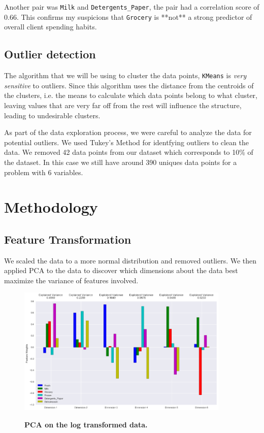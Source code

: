 \documentclass[twoside,openright,titlepage,numbers=noenddot,headinclude,%
               footinclude=true,cleardoublepage=empty,abstractoff,BCOR=5mm,%
               paper=a4,fontsize=11pt,ngerman,american]{scrreprt}
\numberwithin{theorem}{chapter}
\numberwithin{definition}{chapter}
\numberwithin{algorithm}{chapter}
\numberwithin{figure}{chapter}
\numberwithin{table}{chapter}
\numberwithin{equation}{chapter}
\begin{document}
Another pair was \texttt{Milk} and \texttt{Detergents\_Paper}, the pair had a correlation score of 0.66. This confirms my suspicions that \texttt{Grocery} is **not** a strong predictor of overall client spending habits.




\section*{Outlier detection}
The algorithm that we will be using to cluster the data points, \texttt{KMeans} is \emph{very sensitive} to outliers. Since this algorithm uses the distance from the centroids of the clusters, i.e. the means to calculate which data points belong to what cluster, leaving values that are very far off from the rest will influence the structure, leading to undesirable clusters.

As part of the data exploration process, we were careful to analyze the data for potential outliers. We used Tukey's Method for identfying outliers to clean the data. We removed 42 data points from our dataset which corresponds to 10\% of the dataset. In this case we still have around 390 uniques data points for a problem with 6 variables. 


\chapter*{Methodology}

\section*{Feature Transformation}
We scaled the data to a more normal distribution and  removed outliers. We then applied PCA to the data to discover which dimensions about the data best maximize the variance of features involved. 

\begin{figure}[!hbtp]
\centering
    
    \includegraphics[width=0.9\textwidth]{figures/pca}
    \label{pca}
    
    \caption{\textbf{PCA on the log transformed data. }}
\end{figure}
\end{document}
